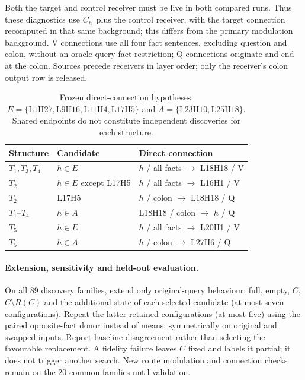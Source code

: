 Both the target and control receiver must be live in both compared runs. Thus
these diagnostics use $C_h^+$ plus the control receiver, with the target connection
recomputed in that same background; this differs from the primary modulation
background. V connections use all four fact sentences, excluding question and
colon, without an oracle query-fact restriction; Q connections originate and end
at the colon. Sources precede receivers in layer order; only the receiver's colon
output row is released.

\begin{table}[t]
\centering\scriptsize
\setlength{\tabcolsep}{3pt}
\begin{tabular}{@{}p{1.05cm}p{1.5cm}p{4.55cm}@{}}
\toprule
Structure & Candidate & Direct connection \\
\midrule
$T_1,T_3,T_4$ & $h\in E$ & $h$ / all facts $\to$ L18H18 / V \\
$T_2$ & $h\in E$ except L17H5 & $h$ / all facts $\to$ L16H1 / V \\
$T_2$ & L17H5 & $h$ / colon $\to$ L18H18 / Q \\
$T_1$--$T_4$ & $h\in A$ & L18H18 / colon $\to$ $h$ / Q \\
$T_5$ & $h\in E$ & $h$ / all facts $\to$ L20H1 / V \\
$T_5$ & $h\in A$ & $h$ / colon $\to$ L27H6 / Q \\
\bottomrule
\end{tabular}
\caption{Frozen direct-connection hypotheses.
$E=\{\mathrm{L1H27,L9H16,L11H4,L17H5}\}$ and
$A=\{\mathrm{L23H10,L25H18}\}$.
Shared endpoints do not constitute independent discoveries for each structure.}
\label{tab:final-attachments}
\end{table}

\paragraph{Extension, sensitivity and held-out evaluation.}
On all 89 discovery families, extend only original-query behaviour: full, empty,
$C$, $C\setminus R(C)$ and the additional state of each selected candidate
(at most seven configurations). Repeat the latter retained configurations
(at most five) using the paired opposite-fact donor instead of means,
symmetrically on original and swapped inputs. Report baseline disagreement rather
than selecting the favourable replacement. A fidelity failure leaves $C$ fixed
and labels it partial; it does not trigger another search. New route modulation
and connection checks remain on the 20 common families until validation.

